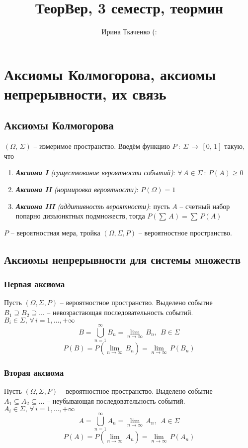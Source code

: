 \documentclass{article}
\title{ТеорВер, 3 семестр, теормин}
\author{Ирина Ткаченко (:}
\begin{document}
\maketitle 
\tableofcontents
\newpage
\section{Аксиомы Колмогорова, аксиомы непрерывности, их связь}
\subsection{Аксиомы Колмогорова}
$(\Omega,\,\Sigma)$ -- измеримое пространство. Введём функцию $P\::\:\Sigma\,\to\,[0,\,1]$ такую, что
\begin{enumerate}
    \item \textit{\textbf{Аксиома I} (существование вероятности событий)}: $\forall\,A\in\Sigma\::\:P(A)\geq0$
    \item \textit{\textbf{Аксиома II} (нормировка вероятности)}: $P(\Omega)=1$
    \item \textit{\textbf{Аксиома III} (аддитивность вероятности)}: пусть $A$ --  счетный набор попарно дизъюнктных подмножеств, тогда $P(\sum\,A)=\sum\,P(A)$
\end{enumerate}
$P$ -- вероятностная мера, тройка $(\Omega,\Sigma,P)$ -- вероятностное пространство.
\subsection{Аксиомы непрерывности для системы множеств}
\subsubsection{Первая аксиома}
Пусть $(\Omega,\Sigma,P)$ -- вероятностное пространство. Выделено событие $B_1\supseteq B_2\supseteq \dots$ -- невозрастающая последовательность событий. $B_i\in\Sigma,\,\forall\,i=1,\dots,+\infty$
\[
B=\bigcup_{n=1}^{\infty} B_{n}=\lim_{n\to\infty}\,B_n,\:\:B\in\Sigma
\] 
$$ P(B)=P(\lim_{n\to\infty}\,B_n)=\lim_{n\to\infty}\,P(B_n) $$
\subsubsection{Вторая аксиома}
Пусть $(\Omega,\Sigma,P)$ -- вероятностное пространство. Выделено событие $A_1\subseteq A_2\subseteq \dots$ -- неубывающая последовательность событий. $A_i\in\Sigma,\,\forall\,i=1,\dots,+\infty$
$$ A=\bigcup_{n=1}^{\infty} A_{n}=\lim_{n\to\infty}\,A_n,\:\:A\in\Sigma $$
$$ P(A)=P(\lim_{n\to\infty}\,A_n)=\lim_{n\to\infty}\,P(A_n) $$
\end{document}
